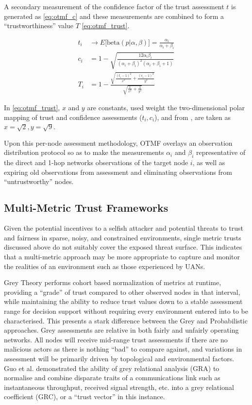 A secondary measurement of the confidence factor of the trust assessment $t$ is generated as \eqref{eq:otmf_c} and these measurements are combined to form a ``trustworthiness'' value $T$ \eqref{eq:otmf_trust}.

\begin{align}
	t_i &\to E\lbrack\text{beta}(p|\alpha,\beta)\rbrack = \frac{\alpha_i}{\alpha_i+\beta_i} \label{eq:otmf_t}\\[5pt]
	c_i &= 1 - \sqrt{\frac{12\alpha_i\beta_i}{(\alpha_i+\beta_i)^2(\alpha_i+\beta_i+1)}} \label{eq:otmf_c}\\[5pt]
	T_i &= 1 - \frac{\sqrt{\frac{(t_i-1)^2}{x^2} + \frac{(c_i-1)^2}{y^2}}}{\sqrt{\frac{1}{x^2}+\frac{1}{y^2}}} \label{eq:otmf_trust}
\end{align}

In \eqref{eq:otmf_trust}, $x$ and $y$ are constants, used weight the two-dimensional polar mapping of trust and confidence assessments ($t_i,c_i$), and from \cite{Zouridaki2005}, are taken as $x=\sqrt{2},y=\sqrt{9}$.

Upon this per-node assessment methodology, OTMF overlays an observation distribution protocol so as to make the measurements $\alpha_i$ and $\beta_i$ representative of the direct and 1-hop networks observations of the target node $i$, as well as expiring old observations from assessment and eliminating observations from ``untrustworthy'' nodes.


\subsection{Multi-Metric Trust Frameworks}\label{sec:multimetrictrust}

Given the potential incentives to a selfish attacker and potential threats to trust and fairness in sparse, noisy, and constrained environments, single metric trusts discussed above do not suitably cover the exposed threat surface. 
This indicates that a multi-metric approach may be more appropriate to capture and monitor the realities of an environment such as those experienced by UANs.

Grey Theory performs cohort based normalization of metrics at runtime, providing a ``grade'' of trust compared to other observed nodes in that interval, while maintaining the ability to reduce trust values down to a stable assessment range for decision support without requiring every environment entered into to be characterised.
This presents a stark difference between the Grey and Probabilistic approaches.
Grey assessments are relative in both fairly and unfairly operating networks.
All nodes will receive mid-range trust assessments if there are no malicious actors as there is nothing ``bad'' to compare against, and variations in assessment will be primarily driven by topological and environmental factors.
Guo et al. \cite{Guo11} demonstrated the ability of grey relational analysis (GRA) \cite{Zuo1995} to normalise and combine disparate traits of a communications link such as instantaneous throughput, received signal strength, etc. into a grey relational coefficient (GRC), or a ``trust vector'' in this instance.

